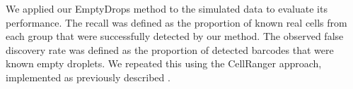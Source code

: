\documentclass[10pt,letterpaper]{article}
\begin{document}
We applied our EmptyDrops method to the simulated data to evaluate its performance.
The recall was defined as the proportion of known real cells from each group that were successfully detected by our method.
The observed false discovery rate was defined as the proportion of detected barcodes that were known empty droplets.
We repeated this using the CellRanger approach, implemented as previously described \cite{zheng2017massively}.



\end{document}
